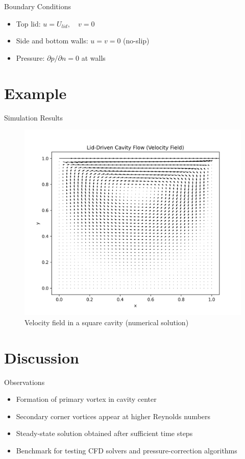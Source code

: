 \documentclass{beamer}
\begin{document}
\begin{frame}{Boundary Conditions}
\begin{itemize}
    \item Top lid: $u = U_{lid}, \quad v = 0$
    \item Side and bottom walls: $u = v = 0$ (no-slip)
    \item Pressure: $\partial p/\partial n = 0$ at walls
\end{itemize}
\end{frame}

\section{Example}
\begin{frame}{Simulation Results}
\begin{figure}[h]
\centering
\includegraphics[width=0.8\linewidth]{cavity_flow.png} %
\caption{Velocity field in a square cavity (numerical solution)}
\end{figure}
\end{frame}

\section{Discussion}
\begin{frame}{Observations}
\begin{itemize}
    \item Formation of primary vortex in cavity center
    \item Secondary corner vortices appear at higher Reynolds numbers
    \item Steady-state solution obtained after sufficient time steps
    \item Benchmark for testing CFD solvers and pressure-correction algorithms
\end{itemize}
\end{frame}
\end{document}
